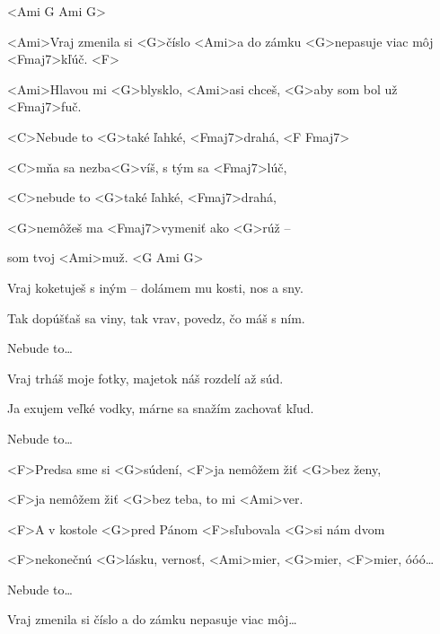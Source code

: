 


<Ami G Ami G>

\zs
<Ami>Vraj zmenila si <G>číslo <Ami>a do zámku <G>nepasuje viac môj <Fmaj7>kľúč. <F>

<Ami>Hlavou mi <G>blysklo, <Ami>asi chceš, <G>aby som bol už <Fmaj7>fuč.
\ks

\zr
<C>Nebude to <G>také ľahké, <Fmaj7>drahá, <F Fmaj7>

<C>mňa sa nezba<G>víš, s tým sa <Fmaj7>lúč,

<C>nebude to <G>také ľahké, <Fmaj7>drahá,

<G>nemôžeš ma <Fmaj7>vymeniť ako <G>rúž –

som tvoj <Ami>muž. <G Ami G>
\kr

\zs
Vraj koketuješ s iným – dolámem mu kosti, nos a sny.

Tak dopúšťaš sa viny, tak vrav, povedz, čo máš s ním.
\ks

\zr
Nebude to…
\kr

\zs
Vraj trháš moje fotky, majetok náš rozdelí až súd.

Ja exujem veľké vodky, márne sa snažím zachovať kľud.
\ks

\zr
Nebude to…
\kr

\zs
<F>Predsa sme si <G>súdení, <F>ja nemôžem žiť <G>bez ženy,

<F>ja nemôžem žiť <G>bez teba, to mi <Ami>ver.

<F>A v kostole <G>pred Pánom <F>sľubovala <G>si nám dvom

<F>nekonečnú <G>lásku, vernosť, <Ami>mier, <G>mier, <F>mier, óóó…
\ks

\zr
Nebude to…
\kr

\zs
Vraj zmenila si číslo a do zámku nepasuje viac môj…
\ks

\kp
